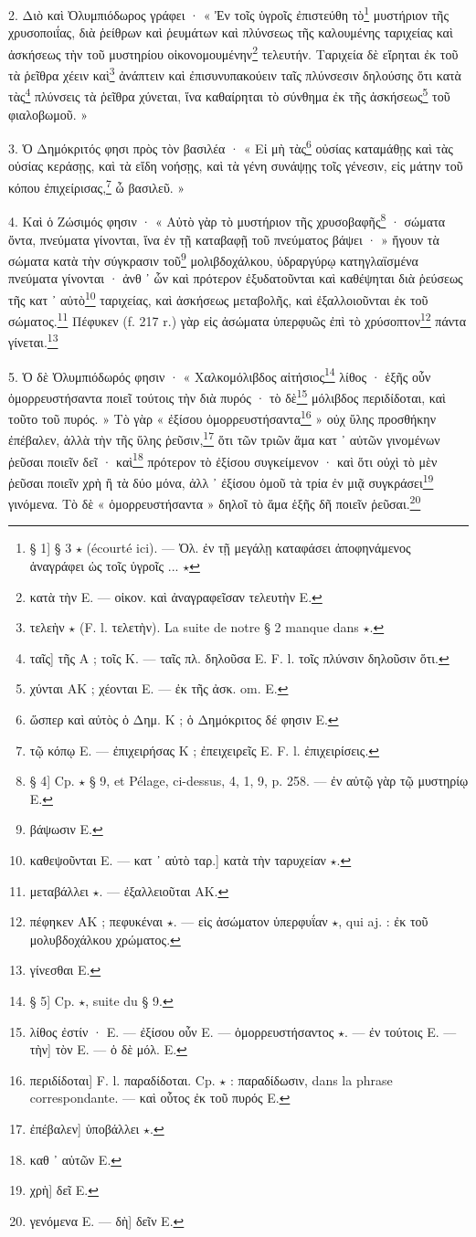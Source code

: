 \documentclass[a4paper, 11pt, oneside, polutonikogreek, french]{article}
\begin{document}
2. Διὸ καὶ Ὀλυμπιόδωρος γράφει · « Ἐν τοῖς ὑγροῖς ἐπιστεύθη τὸ\footnote{§ 1] § 3 $\star$ (écourté ici). --- Ὀλ. ἐν τῇ μεγάλῃ καταφάσει ἀποφηνάμενος ἀναγράφει ὡς τοῖς ὑγροῖς ... $\star$} μυστήριον τῆς χρυσοποιΐας, διὰ ῥείθρων καὶ ῥευμάτων καὶ πλύνσεως τῆς καλουμένης ταριχείας καὶ ἀσκήσεως τὴν τοῦ μυστηρίου οἰκονομουμένην\footnote{κατὰ τὴν E. --- οἰκον. καὶ ἀναγραφεῖσαν τελευτὴν E.} τελευτήν. Ταριχεία δὲ εἴρηται ἐκ τοῦ τὰ ῥεῖθρα χέειν καὶ\footnote{τελεὴν $\star$ (F. l. τελετὴν). La suite de notre § 2 manque dans $\star$.} ἀνάπτειν καὶ ἐπισυνυπακούειν ταῖς πλύνσεσιν δηλούσης ὅτι κατὰ τὰς\footnote{ταῖς] τῆς A ; τοῖς K. --- ταῖς πλ. δηλοῦσα E. F. l. τοῖς πλύνσιν δηλοῦσιν ὅτι.} πλύνσεις τὰ ῥεῖθρα χύνεται, ἵνα καθαίρηται τὸ σύνθημα ἐκ τῆς ἀσκήσεως\footnote{χύνται AK ; χέονται E. --- ἐκ τῆς ἀσκ. om. E.} τοῦ φιαλοβωμοῦ. »

3. Ὁ Δημόκριτός φησι πρὸς τὸν βασιλέα · « Εἰ μὴ τὰς\footnote{ὥσπερ καὶ αὐτὸς ὁ Δημ. K ; ὁ Δημόκριτος δέ φησιν E.} οὐσίας καταμάθῃς καὶ τὰς οὐσίας κεράσῃς, καὶ τὰ εἴδη νοήσῃς, καὶ τὰ γένη συνάψῃς τοῖς γένεσιν, εἰς μάτην τοῦ κόπου ἐπιχείρισας,\footnote{τῷ κόπῳ E. --- ἐπιχειρήσας K ; ἐπειχειρεῖς E. F. l. ἐπιχειρίσεις.} ὦ βασιλεῦ. »

4. Καὶ ὁ Ζώσιμός φησιν · « Αὐτὸ γὰρ τὸ μυστήριον τῆς χρυσοβαφῆς\footnote{§ 4] Cp. $\star$ § 9, et Pélage, ci-dessus, 4, 1, 9, p. 258. --- ἐν αὐτῷ γὰρ τῷ μυστηρίῳ E.} · σώματα ὄντα, πνεύματα γίνονται, ἵνα ἐν τῇ καταβαφῇ τοῦ πνεύματος βάψει · » ἤγουν τὰ σώματα κατὰ τὴν σύγκρασιν τοῦ\footnote{βάψωσιν E.} μολιβδοχάλκου, ὑδραργύρῳ κατηγλαϊσμένα πνεύματα γίνονται · ἀνθ ᾽ ὧν καὶ πρότερον ἐξυδατοῦνται καὶ καθέψηται διὰ ῥεύσεως τῆς κατ ᾽ αὐτὸ\footnote{καθεψοῦνται E. --- κατ ᾽ αὐτὸ ταρ.] κατὰ τὴν ταρυχείαν $\star$.} ταριχείας, καὶ ἀσκήσεως μεταβολῆς, καὶ ἐξαλλοιοῦνται ἐκ τοῦ σώματος.\footnote{μεταβάλλει $\star$. --- ἐξαλλειοῦται AK.} Πέφυκεν (f. 217 r.) γὰρ εἰς ἀσώματα ὑπερφυῶς ἐπὶ τὸ χρύσοπτον\footnote{πέφηκεν AΚ ; πεφυκέναι $\star$. --- εἰς ἀσώματον ὑπερφυΐαν $\star$, qui aj. : ἐκ τοῦ μολυβδοχάλκου χρώματος.} πάντα γίνεται.\footnote{γίνεσθαι E.}

5. Ὁ δὲ Ὀλυμπιόδωρός φησιν · « Χαλκομόλιβδος αἰτήσιος\footnote{§ 5] Cp. $\star$, suite du § 9.} λίθος · ἑξῆς οὖν ὁμορρευστήσαντα ποιεῖ τούτοις τὴν διὰ πυρός · τὸ δὲ\footnote{λίθος ἐστίν · E. --- ἐξίσου οὖν E. --- ὁμορρευστήσαντος $\star$. --- ἐν τούτοις E. --- τὴν] τὸν E. --- ὁ δὲ μόλ. E.} μόλιβδος περιδίδοται, καὶ τοῦτο τοῦ πυρός. » Τὸ γὰρ « ἐξίσου ὁμορρευστήσαντα\footnote{περιδίδοται] F. l. παραδίδοται. Cp. $\star$ : παραδίδωσιν, dans la phrase correspondante. --- καὶ οὗτος ἐκ τοῦ πυρός E.} » οὐχ ὕλης προσθήκην ἐπέβαλεν, ἀλλὰ τὴν τῆς ὕλης ῥεῦσιν,\footnote{ἐπέβαλεν] ὑποβάλλει $\star$.} ὅτι τῶν τριῶν ἅμα κατ ᾽ αὐτῶν γινομένων ῥεῦσαι ποιεῖν δεῖ · καὶ\footnote{καθ ᾽ αὑτῶν E.} πρότερον τὸ ἐξίσου συγκείμενον · καὶ ὅτι οὐχὶ τὸ μὲν ῥεῦσαι ποιεῖν χρὴ ἢ τὰ δύο μόνα, ἀλλ ᾽ ἐξίσου ὁμοῦ τὰ τρία ἐν μιᾷ συγκράσει\footnote{χρὴ] δεῖ E.} γινόμενα. Τὸ δὲ « ὁμορρευστήσαντα » δηλοῖ τὸ ἅμα ἑξῆς δῆ ποιεῖν ῥεῦσαι.\footnote{γενόμενα E. --- δὴ] δεῖν E.}
\end{document}
